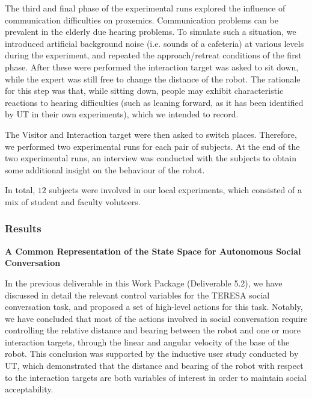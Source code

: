 \documentclass[a4paper,11pt]{report}
\begin{document}
The third and final phase of the experimental runs explored the influence of communication difficulties on proxemics. Communication problems can be prevalent in the elderly due hearing problems. To simulate such a situation, we introduced artificial background noise (i.e. sounds of a cafeteria) at various levels during the experiment, and repeated the approach/retreat conditions of the first phase. After these were performed the interaction target was asked to sit down, while the expert was still free to change the distance of the robot. The rationale for this step was that, while sitting down, people may exhibit characteristic reactions to hearing difficulties (such as leaning forward, as it has been identified by UT in their own experiments), which we intended to record.

The Visitor and Interaction target were then asked to switch places. Therefore, we performed two experimental runs for each pair of subjects. At the end of the two experimental runs, an interview was conducted with the subjects to obtain some additional insight on the behaviour of the robot.

In total, $12$  subjects were involved in our local experiments, which consisted of a mix of student and faculty voluteers.


\subsubsection{Results}
\label{sec:social_results}

{\bf A Common Representation of the State Space for Autonomous Social Conversation}
\label{sec:defining_the_state-space}

In the previous deliverable in this Work Package (Deliverable 5.2), we have discussed in detail the relevant control variables for the TERESA social conversation task, and proposed a set of high-level actions for this task. Notably, we have concluded that most of the actions involved in social conversation require controlling the relative distance and bearing between the robot and one or more interaction targets, through the linear and angular velocity of the base of the robot. This conclusion was supported by the inductive user study conducted by UT, which demonstrated that the distance and bearing of the robot with respect to the interaction targets are both variables of interest in order to maintain social acceptability. 
\end{document}
